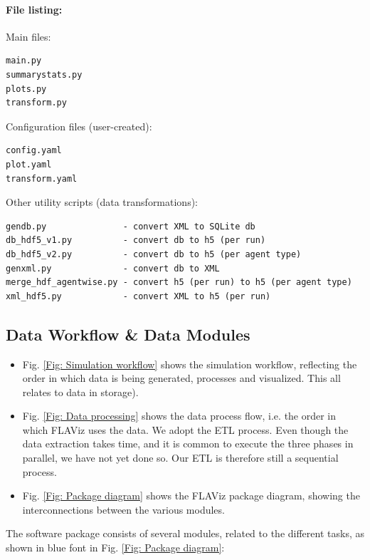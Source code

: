 \documentclass[10pt,a4paper]{article}
\begin{document}
\paragraph{File listing:}

\smallskip
Main files:
\begin{verbatim}
main.py
summarystats.py
plots.py
transform.py
\end{verbatim}

Configuration files (user-created):
\begin{verbatim}
config.yaml
plot.yaml
transform.yaml
\end{verbatim}

Other utility scripts (data transformations):
\begin{verbatim}
gendb.py               - convert XML to SQLite db
db_hdf5_v1.py          - convert db to h5 (per run)
db_hdf5_v2.py          - convert db to h5 (per agent type)
genxml.py              - convert db to XML
merge_hdf_agentwise.py - convert h5 (per run) to h5 (per agent type)
xml_hdf5.py            - convert XML to h5 (per run)
\end{verbatim}


\subsection{Data Workflow \& Data Modules}

\begin{itemize}
\item Fig. \ref{Fig: Simulation workflow} shows the simulation workflow, reflecting the order in which data is being generated, processes and visualized. This all relates to data in storage).

\item Fig. \ref{Fig: Data processing} shows the data process flow, i.e. the order in which FLAViz uses the data. We adopt the ETL process. Even though the data extraction takes time, and it is common to execute the three phases in parallel, we have not yet done so. Our ETL is therefore still a sequential process.

\item Fig. \ref{Fig: Package diagram} shows the FLAViz package diagram, showing the interconnections between the various modules.
\end{itemize}

The software package consists of several modules, related to the different tasks, as shown in blue font in Fig. \ref{Fig: Package diagram}:
\end{document}
